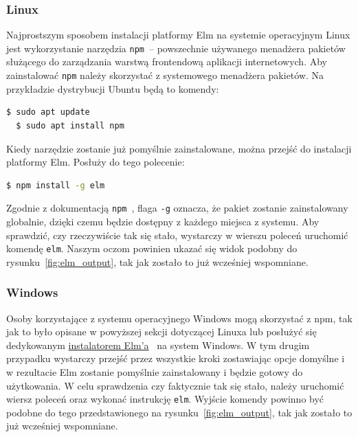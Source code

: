 \documentclass[twoside,a4paper]{report}
\begin{document}
\subsubsection{Linux}
Najprostszym sposobem instalacji platformy Elm na systemie operacyjnym Linux jest wykorzystanie narzędzia \texttt{npm}~-- powszechnie używanego menadżera pakietów służącego do zarządzania warstwą frontendową aplikacji internetowych.
Aby zainstalować \texttt{npm} należy skorzystać z systemowego menadżera pakietów.
Na przykładzie dystrybucji Ubuntu będą to komendy:
\begin{lstlisting}[language=bash]
  $ sudo apt update
  $ sudo apt install npm
\end{lstlisting}
Kiedy narzędzie zostanie już pomyślnie zainstalowane, można przejść do instalacji platformy Elm.
Posłuży do tego polecenie:
\begin{lstlisting}[language=bash]
  $ npm install -g elm
\end{lstlisting}
Zgodnie z dokumentacją \texttt{npm}~\cite{npmdocs}, flaga \texttt{-g} oznacza, że pakiet zostanie zainstalowany globalnie, dzięki czemu będzie dostępny z każdego miejsca z systemu.
Aby sprawdzić, czy rzeczywiście tak się stało, wystarczy w wierszu poleceń uruchomić komendę \texttt{elm}.
Naszym oczom powinien ukazać się widok podobny do rysunku~\ref{fig:elm_output}, tak jak zostało to już wcześniej wspomniane.
\subsubsection{Windows}
Osoby korzystające z systemu operacyjnego Windows mogą skorzystać z npm, tak jak to było opisane w powyższej sekcji dotyczącej Linuxa lub posłużyć się dedykowanym \href{https://github.com/elm/compiler/releases/download/0.19.1/installer-for-windows.exe}{instalatorem Elm'a}~\cite{elm_installer} na system Windows.
W tym drugim przypadku wystarczy przejść przez wszystkie kroki zostawiając opcje domyślne i w rezultacie Elm zostanie pomyślnie zainstalowany i będzie gotowy do użytkowania.
W celu sprawdzenia czy faktycznie tak się stało, należy uruchomić wiersz poleceń oraz wykonać instrukcję \texttt{elm}. Wyjście komendy powinno być podobne do tego przedstawionego na rysunku~\ref{fig:elm_output}, tak jak zostało to już wcześniej wspomniane.
\end{document}
